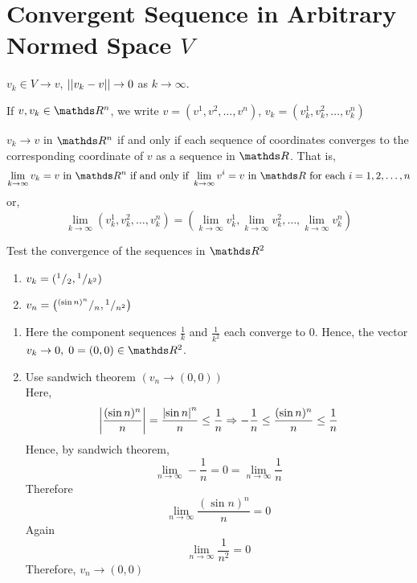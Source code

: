 \documentclass[../main-sheet.tex]{subfiles}
\begin{document}
\section{Convergent Sequence in Arbitrary Normed Space $ V $}
$ v_k\in V \to v$, $ \left\vert\left\vert v_k-v\right\vert\right\vert\to 0  $ as $ k\to \infty $.

If  $ v,v_k\in \R^n $, we write $ v=(v^1,v^2,\dots,v^n) $, $ v_k=(v_k^1,v_k^2,\dots,v_k^n) $
\begin{thm}
    $ v_k\to v $ in $ \R^n $ if and only if each sequence of coordinates converges to the corresponding coordinate of $ v $ as a sequence in $ \R $. That is,
    \[
        \lim_{k\to \infty}v_k=v\text{ in }\R^n \text{ if and only if }\lim_{k\to \infty}v^i=v \text{ in }\R\text{ for each }i=1,2,\dots,n
    \]
    or,
    \[
        \lim_{k\to\infty} \left( v_k^1,v_k^2,\dots,v_k^n \right)=\left( \lim_{k\to\infty}v_k^1,\lim_{k\to\infty} v_k^2,\dots,\lim_{k\to\infty} v_k^n \right)
    \]
\end{thm}
\begin{prob}
    Test the convergence of the sequences in $ \R^2 $
    \begin{enumerate}
        \item $ v_k=({}^{1}/{}_{2},{}^{1}/{}_{k^2}) $
        \item $ v_n=\left( {}^{(\sin n)^n}/{}_{n},{}^{1}/{}_{n^2} \right) $
    \end{enumerate}
\end{prob}
\begin{soln}
    \hfill
    \begin{enumerate}
        \item Here the component sequences $ \frac{1}{k} $ and $ \frac{1}{k^2} $ each converge to 0. Hence, the vector $ v_k\to0,\;0=(0,0)\in\R^2 $.
        \item Use sandwich theorem $ \left( v_n\to (0,0) \right) $\\
        Here,
        \[
            \left\vert\frac{(\sin n)^n}{n}\right\vert=\frac{\left\vert\sin n\right\vert^n}{n}\leq \frac{1}{n} \Rightarrow -\frac{1}{n}\leq \frac{(\sin n)^n}{n}\leq \frac{1}{n}
        \]
        Hence, by sandwich theorem, 
        \[
            \lim_{n\to \infty}-\frac{1}{n}=0=\lim_{n\to \infty}\frac{1}{n} 
        \]
        Therefore 
        \[ 
            \lim_{n\to \infty}\frac{(\sin n)^n}{n}=0 
        \]
        Again 
        \[
             \lim_{n\to\infty}\frac{1}{n^2}=0 
        \]
        Therefore, $v_n\to (0,0)$
    \end{enumerate}
\end{soln}
\end{document}
